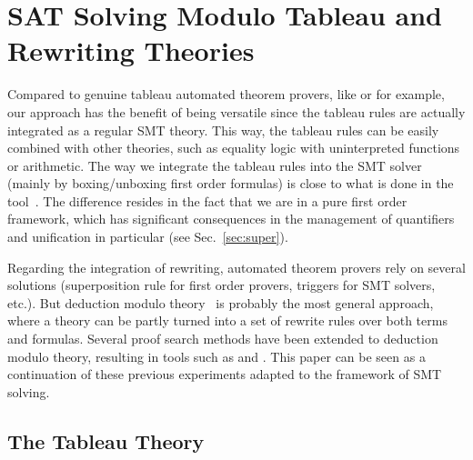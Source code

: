 
\section{SAT Solving Modulo Tableau and Rewriting Theories}
\label{sec:smt}

Compared to genuine tableau automated theorem provers, like \princess{} or
\zenon{} for example, our approach has the benefit of being versatile since the
tableau rules are actually integrated as a regular SMT theory. This way, the
tableau rules can be easily combined with other theories, such as equality logic
with uninterpreted functions or arithmetic. The way we integrate the tableau
rules into the SMT solver (mainly by boxing/unboxing first order formulas) is
close to what is done in the \satallax{} tool~\cite{CEB12}. The difference
resides in the fact that we are in a pure first order framework, which has
significant consequences in the management of quantifiers and unification in
particular (see Sec.~\ref{sec:super}).

Regarding the integration of rewriting, automated theorem provers rely on
several solutions (superposition rule for first order provers, triggers for SMT
solvers, etc.). But deduction modulo theory~\cite{DA03} is probably the most
general approach, where a theory can be partly turned into a set of rewrite
rules over both terms and formulas. Several proof search methods have been
extended to deduction modulo theory, resulting in tools such as \iproverm{} and
\zenm{}. This paper can be seen as a continuation of these previous experiments
adapted to the framework of SMT solving.


\subsection{The Tableau Theory}
\label{sec:tab}


